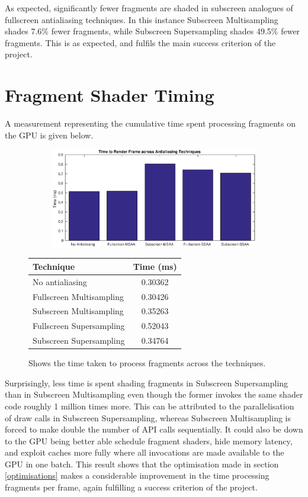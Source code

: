 \documentclass[12pt,a4paper,twoside,openright]{report}
\begin{document}
As expected, significantly fewer fragments are shaded in subscreen analogues of fullscreen antialiasing techniques. In this instance Subscreen Multisampling shades 7.6\% fewer fragments, while Subscreen Supersampling shades 49.5\% fewer fragments. This is as expected, and fulfils the main success criterion of the project.

\clearpage

\section{Fragment Shader Timing}

A measurement representing the cumulative time spent processing fragments on the GPU is given below.

\begin{figure}[tbh]

 
\begin{subfigure}{0.5\textwidth}
\includegraphics[width=1.2\linewidth]{figs/timeToRenderFrame.eps}
\end{subfigure}
\qquad
\begin{tabular}{l|c}
Technique   & Time (ms) \\ 
\hline
No antialiasing      & 0.30362 \\
Fullscreen Multisampling     & 0.30426 \\
Subscreen Multisampling    &  0.35263  \\
Fullscreen Supersampling      &  0.52043   \\
Subscreen Supersampling    &  0.34764  \\
\end{tabular}
 
\caption{Shows the time taken to process fragments across the techniques.}
\end{figure}

Surprisingly, less time is spent shading fragments in Subscreen Supersampling than in Subscreen Multisampling even though the former invokes the same shader code roughly 1 million times more. This can be attributed to the parallelisation of draw calls in Subscreen Supersampling, whereas Subscreen Multisampling is forced to make double the number of API calls sequentially. It could also be down to the GPU being better able schedule fragment shaders, hide memory latency, and exploit caches more fully where all invocations are made available to the GPU in one batch. This result shows that the optimisation made in section \ref{optimisations} makes a considerable improvement in the time processing fragments per frame, again fulfilling a success criterion of the project. \\
\end{document}
